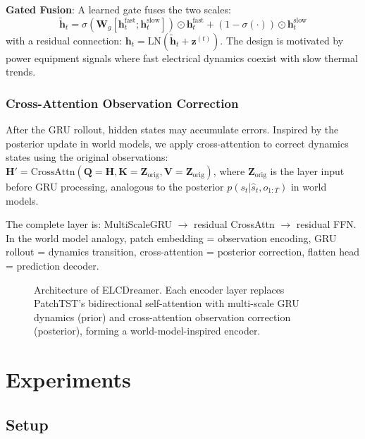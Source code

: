 \documentclass[conference]{IEEEtran}
\begin{document}
\textbf{Gated Fusion}: A learned gate fuses the two scales:
\begin{equation}
    \tilde{\mathbf{h}}_t = \sigma(\mathbf{W}_g [\mathbf{h}_t^{\text{fast}}; \mathbf{h}_t^{\text{slow}}]) \odot \mathbf{h}_t^{\text{fast}} + (1 - \sigma(\cdot)) \odot \mathbf{h}_t^{\text{slow}}
\end{equation}
with a residual connection: $\mathbf{h}_t = \text{LN}(\tilde{\mathbf{h}}_t + \mathbf{z}^{(t)})$. The design is motivated by power equipment signals where fast electrical dynamics coexist with slow thermal trends.

\subsubsection{Cross-Attention Observation Correction}

After the GRU rollout, hidden states may accumulate errors. Inspired by the posterior update in world models, we apply cross-attention to correct dynamics states using the original observations:
$\mathbf{H}' = \text{CrossAttn}(\mathbf{Q}{=}\mathbf{H}, \mathbf{K}{=}\mathbf{Z}_{\text{orig}}, \mathbf{V}{=}\mathbf{Z}_{\text{orig}})$,
where $\mathbf{Z}_{\text{orig}}$ is the layer input before GRU processing, analogous to the posterior $p(s_t | \hat{s}_t, o_{1:T})$ in world models.

The complete layer is: MultiScaleGRU $\to$ residual CrossAttn $\to$ residual FFN. In the world model analogy, patch embedding = observation encoding, GRU rollout = dynamics transition, cross-attention = posterior correction, flatten head = prediction decoder.

\begin{figure}[t]
\centering
\resizebox{\columnwidth}{!}{}
\caption{Architecture of ELCDreamer. Each encoder layer replaces PatchTST's bidirectional self-attention with multi-scale GRU dynamics (prior) and cross-attention observation correction (posterior), forming a world-model-inspired encoder.}
\label{fig:arch}
\end{figure}

\section{Experiments}

\subsection{Setup}
\end{document}
